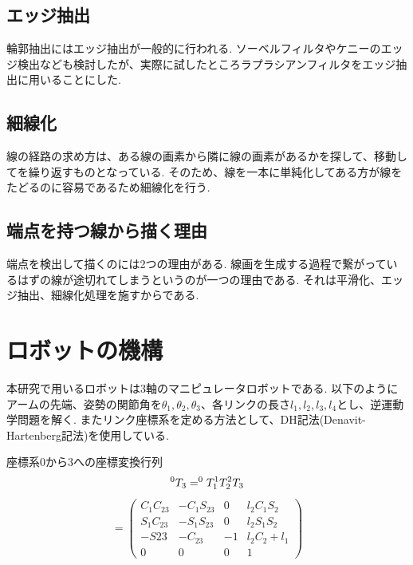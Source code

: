 \documentclass[a4j]{jarticle}			%
\begin{document}
\begin{multicols}{2}
\subsection{エッジ抽出}
輪郭抽出にはエッジ抽出が一般的に行われる.
ソーベルフィルタやケニーのエッジ検出なども検討したが、実際に試したところラプラシアンフィルタをエッジ抽出に用いることにした.


\subsection{細線化}
線の経路の求め方は、ある線の画素から隣に線の画素があるかを探して、移動してを繰り返すものとなっている.
そのため、線を一本に単純化してある方が線をたどるのに容易であるため細線化を行う.


\subsection{端点を持つ線から描く理由}
端点を検出して描くのには2つの理由がある.
線画を生成する過程で繋がっているはずの線が途切れてしまうというのが一つの理由である.
それは平滑化、エッジ抽出、細線化処理を施すからである.

\section{ロボットの機構}
本研究で用いるロボットは3軸のマニピュレータロボットである.
以下のようにアームの先端、姿勢の関節角を$\theta_1, \theta_2, \theta_3$、各リンクの長さ$l_1, l_2, l_3, l_4$とし、逆運動学問題を解く.
またリンク座標系を定める方法として、DH記法(Denavit-Hartenberg記法)を使用している.



座標系0から3への座標変換行列 
$$
	^{0}T_{3}=^{0}T_{1} ^{1}T_{2} ^{2}T_{3} \\
$$
\begin{equation*}
	\begin{array}{cc}
		=
		\left( 
			\begin{array}{cccc}
				C_1C_{23} & -C_1S_{23} & 0 & l_2C_1S_2 \\
				S_1C_{23} & -S_1S_{23} & 0 & l_2S_1S_2 \\
				-S{23} & -C_{23} & -1 & l_2C_2 + l_1 \\
				0 & 0 & 0 & 1 
			\end{array}
		\right)
	\end{array}
\end{equation*}


\end{multicols}
\end{document}
